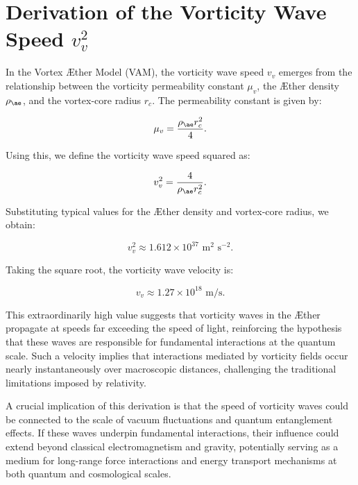 \section{Derivation of the Vorticity Wave Speed $v_v^2$}

In the Vortex \AE ther Model (VAM), the vorticity wave speed $v_v$ emerges from the relationship between the vorticity permeability constant $\mu_v$, the \AE ther density $\rho_{\ae}$, and the vortex-core radius $r_c$. The permeability constant is given by:

\begin{equation}
    \mu_v = \frac{\rho_{\ae} r_c^2}{4}.
\end{equation}

Using this, we define the vorticity wave speed squared as:

\begin{equation}
    v_v^2 = \frac{4}{\rho_{\ae} r_c^2}.
\end{equation}

Substituting typical values for the \AE ther density and vortex-core radius, we obtain:

\begin{equation}
    v_v^2 \approx 1.612 \times 10^{37} \text{ m}^2 \text{ s}^{-2}.
\end{equation}

Taking the square root, the vorticity wave velocity is:

\begin{equation}
    v_v \approx 1.27 \times 10^{18} \text{ m/s}.
\end{equation}

This extraordinarily high value suggests that vorticity waves in the \AE ther propagate at speeds far exceeding the speed of light, reinforcing the hypothesis that these waves are responsible for fundamental interactions at the quantum scale. Such a velocity implies that interactions mediated by vorticity fields occur nearly instantaneously over macroscopic distances, challenging the traditional limitations imposed by relativity.

A crucial implication of this derivation is that the speed of vorticity waves could be connected to the scale of vacuum fluctuations and quantum entanglement effects. If these waves underpin fundamental interactions, their influence could extend beyond classical electromagnetism and gravity, potentially serving as a medium for long-range force interactions and energy transport mechanisms at both quantum and cosmological scales.

